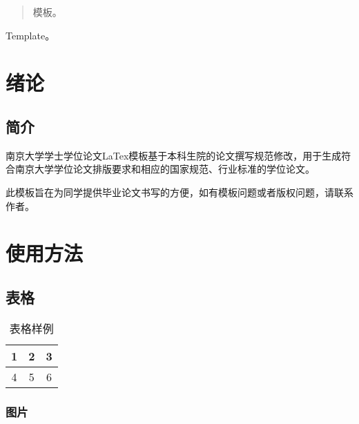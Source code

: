 \documentclass[
    Title = 曲率引擎的研究, %
    Title_EN = Curvature engine research,
    Grade = 17,
    StudentID = 17184xxx,
    StudentName = 张三,
    StudentName_EN = ZhangSan,
    Department = 未来学院,
    Department_EN = School of future,
    Major = 未来学,
    Major_EN = Future,
    Mentor = 李四,
    Mentor_EN = LiSi,
    MentorTitle = 教授,
    MentorTitle_EN = Professor
    SubmitDate = 2077年12月31日,
    Degree = 本科, %
    Type = thesis %
]{njuthesis}
\begin{document}
\maketitle


\begin{abstract}
    模板。
\end{abstract}

\begin{englishabstract}
    Template。
  \end{englishabstract}

\tableofcontents
\mainmatter

\chapter{绪论}
    \section{简介}
    南京大学学士学位论文LaTex模板\cite{test1}基于本科生院的论文撰写规范修改，用于生成符合南京大学学位论文排版要求和相应的国家规范、行业标准的学位论文。

    此模板旨在为同学提供毕业论文书写的方便，如有模板问题或者版权问题，请联系作者。
\chapter{使用方法}
    \section{表格}
    \begin{table}[htbp]
        \centering
        \caption{表格样例}
        \begin{tabular}{|c|c|c|}
            \hline
            1 & 2 & 3 \\
            \hline
            4 &  5 & 6 \\
            \hline
        \end{tabular}
    \end{table}
    \subsection{图片}

\printbibliography
\end{document}
